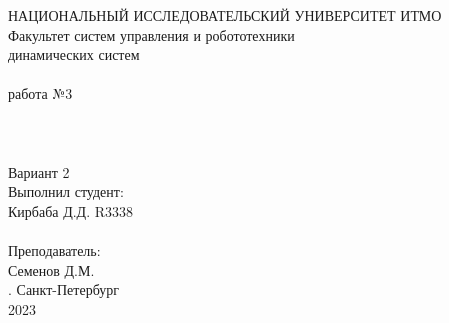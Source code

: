 \documentclass[12pt]{article}
\begin{document}
\begin{titlepage}
\begin{center}
    {\small НАЦИОНАЛЬНЫЙ ИССЛЕДОВАТЕЛЬСКИЙ УНИВЕРСИТЕТ ИТМО} \\
    {\small Факультет систем управления и робототехники} \\
    \vspace*{10\baselineskip}
    { динамических систем} \\
    \ \\
    { работа №3} \\
    \ \\
    {} \\
    \ \\
    Вариант 2 \\
    \vspace*{10\baselineskip}
    \hfill {\small Выполнил студент:} \\
    \hfill {\small Кирбаба Д.Д. R3338} \\
    \ \\
    \hfill {\small Преподаватель:} \\
    \hfill {\small Семенов Д.М.} \\
    \mbox{}
    \vfill {. Санкт-Петербург\\2023}
\end{center}
\end{titlepage}
\end{document}
